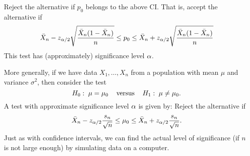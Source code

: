 \documentclass[preprint,  11pt]{amsart}
\def\sig{{\sigma}}
\renewcommand{\beit}{\begin{itemize}\setlength\itemsep{3pt}}
\begin{document}
Reject the alternative if $p_{0}$ belongs to the above CI. That is, accept the alternative if
$$
\bar{X}_{n}-z_{\alpha/2}\sqrt{\frac{\bar{X}_{n}(1-\bar{X}_{n})}{n}}\le p_{0}\le \bar{X}_{n}+z_{\alpha/2}\sqrt{\frac{\bar{X}_{n}(1-\bar{X}_{n})}{n}}
$$
This test has (approximately) significance level $\alpha$.

\medskip
More generally, if we have data $X_{1},\ldots ,X_{n}$ from a population with mean $\mu$ and variance $\sig^{2}$, then consider the test
$$
H_{0}: \; \mu=\mu_{0} \;\;\; \mbox{ versus }\;\;\; H_{1}: \; \mu\not=\mu_{0}.
$$
A test with approximate significance level $\alpha$ is given by: Reject the alternative if
$$
\bar{X}_{n}-z_{\alpha/2}\frac{s_{n}}{\sqrt{n}}\le \mu_{0}\le \bar{X}_{n}+z_{\alpha/2}\frac{s_{n}}{\sqrt{n}}.
$$
Just as with confidence intervals, we can find the actual level of significance (if $n$ is not large enough) by simulating data on a computer.



\end{document}
